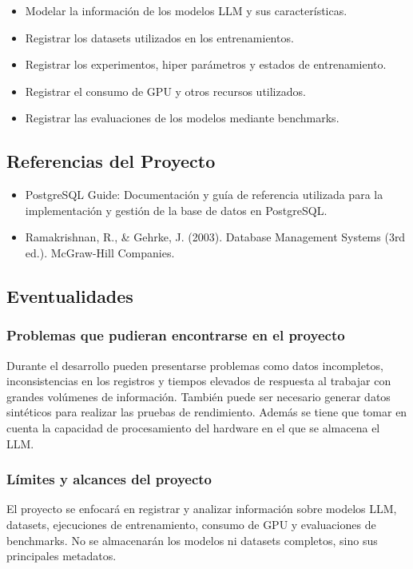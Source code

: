 \documentclass[12pt,a4paper]{article}
\begin{document}
{\begin{itemize}
  \item Modelar la información de los modelos LLM y sus características.
  \item Registrar los datasets utilizados en los entrenamientos.
  \item Registrar los experimentos, hiper parámetros y estados de entrenamiento.
  \item Registrar el consumo de GPU y otros recursos utilizados.
  \item Registrar las evaluaciones de los modelos mediante benchmarks.
\end{itemize}
}

\subsection{Referencias del Proyecto}
{\begin{itemize}
  \item PostgreSQL Guide: Documentación y guía de referencia utilizada para la implementación y gestión de la base de datos en PostgreSQL.
  \item Ramakrishnan, R., \& Gehrke, J. (2003). Database Management Systems (3rd ed.). McGraw-Hill Companies.
\end{itemize}
}

\subsection{Eventualidades}

\subsubsection{Problemas que pudieran encontrarse en el proyecto}

Durante el desarrollo pueden presentarse problemas como datos incompletos, inconsistencias en los registros y tiempos elevados de respuesta al trabajar con grandes volúmenes de información. También puede ser necesario generar datos sintéticos para realizar las pruebas de rendimiento. Además se tiene que tomar en cuenta la capacidad de procesamiento del hardware en el que se almacena el LLM.

\subsubsection{Límites y alcances del proyecto}

El proyecto se enfocará en registrar y analizar información sobre modelos LLM, datasets, ejecuciones de entrenamiento, consumo de GPU y evaluaciones de benchmarks. No se almacenarán los modelos ni datasets completos, sino sus principales metadatos.
\end{document}
